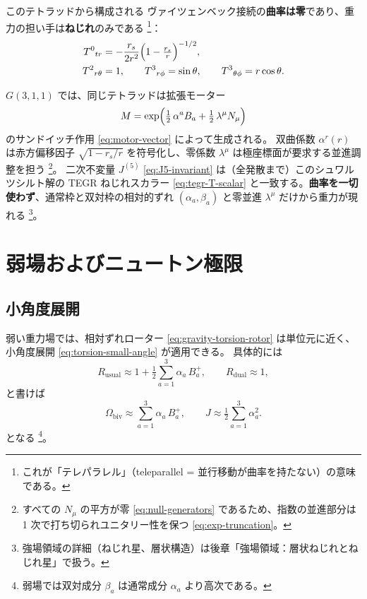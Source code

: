 \documentclass[dvipdfmx,a4paper,oneside]{jsbook}
\numberwithin{equation}{chapter}
\begin{document}
このテトラッドから構成される ヴァイツェンベック接続の\textbf{曲率は零}であり、重力の担い手は\textbf{ねじれ}のみである \footnote{これが「テレパラレル」（teleparallel = 並行移動が曲率を持たない）の意味である。}：
\begin{align}
  T^{0}{}_{tr} &= -\frac{r_s}{2r^2}\Bigl(1 - \tfrac{r_s}{r}\Bigr)^{-1/2}, \nonumber\\
  T^{2}{}_{r\theta} &= 1, \qquad
  T^{3}{}_{r\phi} = \sin\theta, \qquad
  T^{3}{}_{\theta\phi} = r\cos\theta.
  \label{eq:gravity-sch-torsion}
\end{align}

\(G(3,1,1)\) では、同じテトラッドは拡張モーター
\begin{equation}
  M = \exp\Bigl(\tfrac{1}{2}\,\alpha^a B_a + \tfrac{1}{2}\,\lambda^\mu N_\mu\Bigr)
  \label{eq:gravity-sch-motor}
\end{equation}
のサンドイッチ作用 \eqref{eq:motor-vector} によって生成される。
双曲係数 \(\alpha^r(r)\) は赤方偏移因子 \(\sqrt{1 - r_s/r}\) を符号化し、零係数 \(\lambda^\mu\) は極座標面が要求する並進調整を担う \footnote{すべての \(N_\mu\) の平方が零 \eqref{eq:null-generators} であるため、指数の並進部分は 1 次で打ち切られユニタリー性を保つ \eqref{eq:exp-truncation}。}。
二次不変量 \(J^{(5)}\) \eqref{eq:J5-invariant} は（全発散まで）このシュワルツシルト解の TEGR ねじれスカラー \eqref{eq:tegr-T-scalar} と一致する。\textbf{曲率を一切使わず}、通常枠と双対枠の相対的ずれ \((\alpha_a, \beta_a)\) と零並進 \(\lambda^\mu\) だけから重力が現れる \footnote{強場領域の詳細（ねじれ星、層状構造）は後章「強場領域：層状ねじれとねじれ星」で扱う。}。

\section{弱場およびニュートン極限}

\subsection{小角度展開}

弱い重力場では、相対ずれローター \eqref{eq:gravity-torsion-rotor} は単位元に近く、小角度展開 \eqref{eq:torsion-small-angle} が適用できる。
具体的には
\begin{equation}
  R_{\mathrm{usual}} \approx 1 + \tfrac{1}{2} \sum_{a=1}^{3} \alpha_a\, B_a^{+},
  \qquad
  R_{\mathrm{dual}} \approx 1,
  \label{eq:gravity-weak-rotors}
\end{equation}
と書けば
\begin{equation}
  \Omega_{\mathrm{biv}} \approx \sum_{a=1}^{3} \alpha_a\, B_a^{+},
  \qquad
  J \approx \tfrac{1}{2} \sum_{a=1}^{3} \alpha_a^2.
  \label{eq:gravity-weak-J}
\end{equation}
となる \footnote{弱場では双対成分 \(\beta_a\) は通常成分 \(\alpha_a\) より高次である。}。
\end{document}
